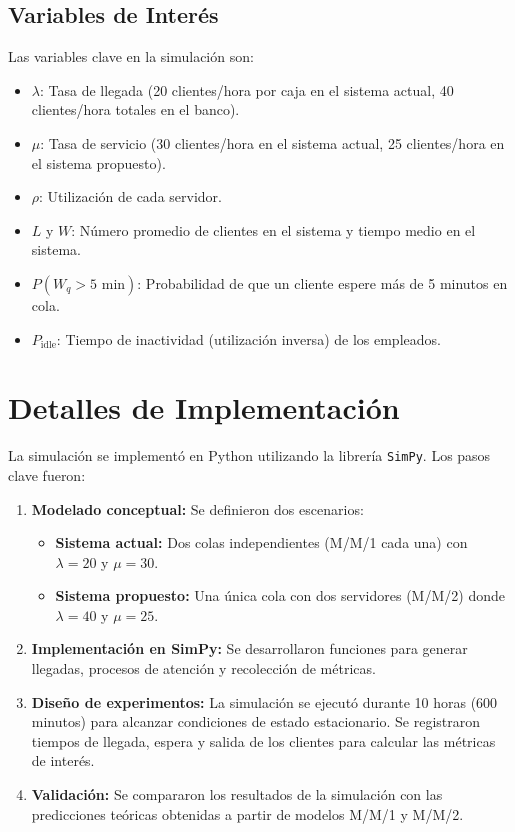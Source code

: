 \documentclass[12pt]{article}
\begin{document}
\subsection{Variables de Interés}
Las variables clave en la simulación son:
\begin{itemize}
    \item \(\lambda\): Tasa de llegada (20 clientes/hora por caja en el sistema actual, 40 clientes/hora totales en el banco).
    \item \(\mu\): Tasa de servicio (30 clientes/hora en el sistema actual, 25 clientes/hora en el sistema propuesto).
    \item \(\rho\): Utilización de cada servidor.
    \item \(L\) y \(W\): Número promedio de clientes en el sistema y tiempo medio en el sistema.
    \item \(P(W_q > 5\text{ min})\): Probabilidad de que un cliente espere más de 5 minutos en cola.
    \item \(P_{\text{idle}}\): Tiempo de inactividad (utilización inversa) de los empleados.
\end{itemize}

\section{Detalles de Implementación}\label{sec:implementacion}
La simulación se implementó en Python utilizando la librería \texttt{SimPy}. Los pasos clave fueron:

\begin{enumerate}
    \item \textbf{Modelado conceptual:} Se definieron dos escenarios:
    \begin{itemize}
        \item \textbf{Sistema actual:} Dos colas independientes (M/M/1 cada una) con \(\lambda = 20\) y \(\mu = 30\).
        \item \textbf{Sistema propuesto:} Una única cola con dos servidores (M/M/2) donde \(\lambda = 40\) y \(\mu = 25\).
    \end{itemize}
    \item \textbf{Implementación en SimPy:} Se desarrollaron funciones para generar llegadas, procesos de atención y recolección de métricas.
    \item \textbf{Diseño de experimentos:} La simulación se ejecutó durante 10 horas (600 minutos) para alcanzar condiciones de estado estacionario. Se registraron tiempos de llegada, espera y salida de los clientes para calcular las métricas de interés.
    \item \textbf{Validación:} Se compararon los resultados de la simulación con las predicciones teóricas obtenidas a partir de modelos M/M/1 y M/M/2.
\end{enumerate}
\end{document}
